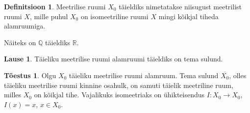 \documentclass{article}[12pt]
\newcommand{\R}{\mathbb{R}}
\newcommand{\Q}{\mathbb{Q}}
\theoremstyle{definition}
\newtheorem{definition}{Definitsioon}[section]
\theoremstyle{definition}
\theoremstyle{definition}
\newtheorem{lause}{Lause}[section]
\theoremstyle{break}
\newtheorem*{toestus}{Tõestus}
\begin{document}
\begin{definition}
	Meetrilise ruumi $X_0$ täieldiks nimetatakse niisugust meetrilist ruumi $X$, mille puhul $X_0$ on isomeetriline ruumi $X$ mingi kõikjal tiheda alamruumiga.
\end{definition}

Näiteks on $\Q$ täieldiks $\R$.

\begin{lause}
	Täieliku meetrilise ruumi alamruumi täieldiks on tema sulund.
\end{lause}

\begin{toestus}
	Olgu $X_0$ täieliku meetrilise ruumi alamruum. 
	Tema sulund $\overline{X_0}$, olles täieliku meetrilise ruumi kinnine osahulk, on samuti täielik meetriline ruum, milles $X_0$ on kõikjal tihe.
	Vajalikuks isomeetriaks on ühikteisendus $I:X_0\rightarrow X_0$, $I(x) = x$, $x\in X_0$.
\end{toestus}
\end{document}
